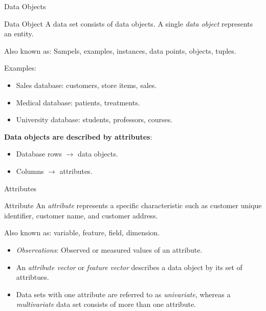 \begin{frame}{Data Objects}
  \begin{block}{Data Object}
    A data set consists of data objects. A single \textit{data object} represents an entity.
  \end{block}

  Also known as: Sampels, examples, instances, data points, objects, tuples.\\\medskip

  Examples:
  \begin{itemize}
  \item Sales database: customers, store items, sales.
  \item Medical database: patients, treatments.
  \item University database: students, professors, courses.
  \end{itemize}

  \textbf{Data objects are described by attributes}:
  \begin{itemize}
  \item Database rows $\rightarrow$ data objects.
  \item Columns $\rightarrow$ attributes.
  \end{itemize}
\end{frame}

\begin{frame}{Attributes}
  \begin{block}{Attribute}
    An \textit{attribute} represents a specific characteristic such as customer
    unique identifier, customer name, and customer address.
  \end{block}

  Also known as: variable, feature, field, dimension.\\\medskip


  \begin{itemize}
  \item \textit{Observations}: Observed or measured values of an attribute.
  \item An \textit{attribute vector} or \textit{feature vector} describes a
    data object by its set of attribtues.
  \item Data sets with one attribute are referred to as \textit{univariate},
    whereas a \textit{multivariate} data set consists of more than one
    attribute.
  \end{itemize}
\end{frame}

